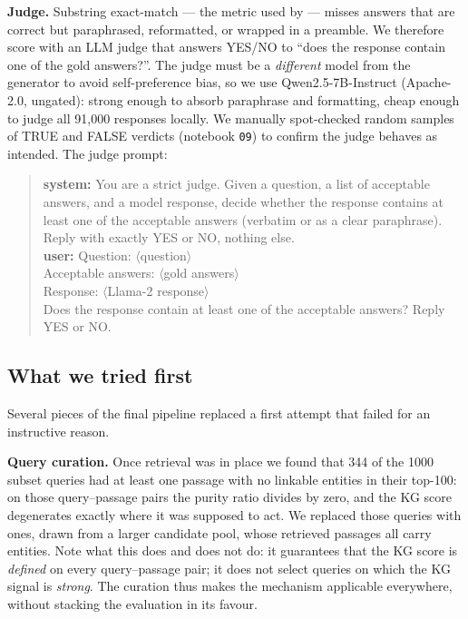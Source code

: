 \documentclass{article}
\begin{document}
\textbf{Judge.} Substring exact-match --- the metric used by \citet{Cuconasu_2024} --- misses answers that are correct but paraphrased, reformatted, or wrapped in a preamble. We therefore score with an LLM judge that answers YES/NO to ``does the response contain one of the gold answers?''. The judge must be a \emph{different} model from the generator to avoid self-preference bias, so we use Qwen2.5-7B-Instruct (Apache-2.0, ungated): strong enough to absorb paraphrase and formatting, cheap enough to judge all 91{,}000 responses locally. We manually spot-checked random samples of TRUE and FALSE verdicts (notebook \texttt{09}) to confirm the judge behaves as intended. The judge prompt:
\begin{quote}\footnotesize\ttfamily
\textrm{\textbf{system:}} You are a strict judge. Given a question, a list of acceptable answers, and a model response, decide whether the response contains at least one of the acceptable answers (verbatim or as a clear paraphrase). Reply with exactly YES or NO, nothing else.\\[3pt]
\textrm{\textbf{user:}} Question: \textrm{$\langle$question$\rangle$}\\
Acceptable answers: \textrm{$\langle$gold answers$\rangle$}\\
Response: \textrm{$\langle$Llama-2 response$\rangle$}\\[3pt]
Does the response contain at least one of the acceptable answers? Reply YES or NO.
\end{quote}

\subsection*{What we tried first}
Several pieces of the final pipeline replaced a first attempt that failed for an instructive reason.

\textbf{Query curation.} Once retrieval was in place we found that 344 of the 1000 subset queries had at least one passage with no linkable entities in their top-100: on those query--passage pairs the purity ratio divides by zero, and the KG score degenerates exactly where it was supposed to act. We replaced those queries with ones, drawn from a larger candidate pool, whose retrieved passages all carry entities. Note what this does and does not do: it guarantees that the KG score is \emph{defined} on every query--passage pair; it does not select queries on which the KG signal is \emph{strong}. The curation thus makes the mechanism applicable everywhere, without stacking the evaluation in its favour.
\end{document}
